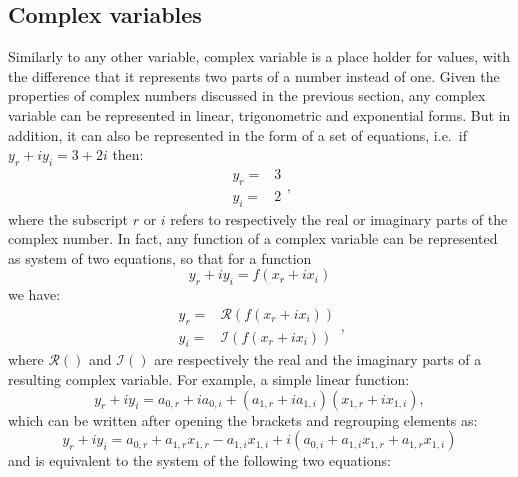 \documentclass[
]{book}
\begin{document}
\hypertarget{complexVariable}{%
\subsection{Complex variables}\label{complexVariable}}

Similarly to any other variable, complex variable is a place holder for values, with the difference that it represents two parts of a number instead of one. Given the properties of complex numbers discussed in the previous section, any complex variable can be represented in linear, trigonometric and exponential forms. But in addition, it can also be represented in the form of a set of equations, i.e.~if \(y_r + i y_i = 3+2i\) then:
\begin{equation}
    \begin{aligned}
        y_r = & 3 \\
        y_i = & 2
    \end{aligned} ,
    \label{eq:complexVariablesSystem}
\end{equation}
where the subscript \(r\) or \(i\) refers to respectively the real or imaginary parts of the complex number. In fact, any function of a complex variable can be represented as system of two equations, so that for a function
\begin{equation}
    y_{r} + i y_{i} = f(x_r+ix_i)
    \label{eq:complexFunction}
\end{equation}
we have:
\begin{equation}
    \begin{aligned}
        y_r = & \mathcal{R}(f(x_r+ix_i)) \\
        y_i = & \mathcal{I}(f(x_r+ix_i))
    \end{aligned} ,
    \label{eq:complexFunctionSystem}
\end{equation}
where \(\mathcal{R}()\) and \(\mathcal{I}()\) are respectively the real and the imaginary parts of a resulting complex variable. For example, a simple linear function:
\begin{equation*}
    y_r + i y_i = a_{0,r} + i a_{0,i} + (a_{1,r} + i a_{1,i}) (x_{1,r} + i x_{1,i}),
\end{equation*}
which can be written after opening the brackets and regrouping elements as:
\begin{equation*}
    y_r + i y_i = a_{0,r} + a_{1,r} x_{1,r} - a_{1,i} x_{1,i} + i \left( a_{0,i} + a_{1,i} x_{1,r} + a_{1,r} x_{1,i} \right)
\end{equation*}
and is equivalent to the system of the following two equations:
\end{document}
